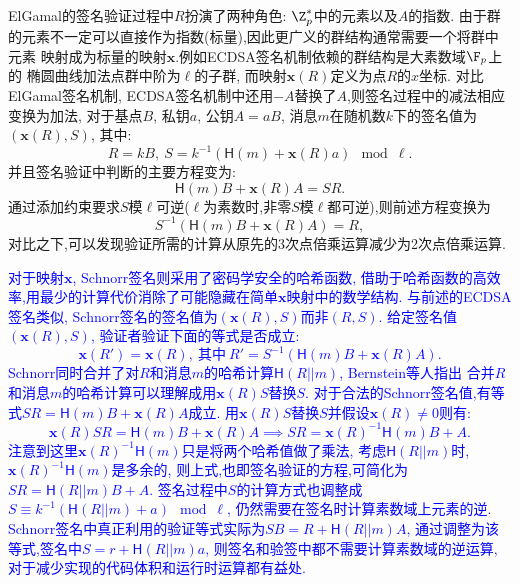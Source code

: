 ElGamal的签名验证过程中$R$扮演了两种角色: $\Z^*_p$中的元素以及$A$的指数.
由于群的元素不一定可以直接作为指数(标量),因此更广义的群结构通常需要一个将群中元素
映射成为标量的映射$\mathbf{x}$.例如ECDSA签名机制依赖的群结构是大素数域$\F_p$上的
椭圆曲线加法点群中阶为$\ell$的子群, 而映射$\mathbf{x}(R)$定义为点$R$的$x$坐标.
对比ElGamal签名机制, ECDSA签名机制中还用$-A$替换了$A$,则签名过程中的减法相应
变换为加法, 对于基点$B$, 私钥$a$, 公钥$A = aB$, 
消息$m$在随机数$k$下的签名值为$(\mathbf{x}(R),S)$, 其中:
$$R = kB, \ S = k^{-1}(\textsf{H}(m) + \mathbf{x}(R)a) \mod \ell.$$
并且签名验证中判断的主要方程变为: 
$$\textsf{H}(m)B + \mathbf{x}(R)A = SR.$$
通过添加约束要求$S$模$\ell$可逆($\ell$为素数时,非零$S$模$\ell$都可逆),则前述方程变换为
$$S^{-1}\left(\textsf{H}(m)B + \mathbf{x}(R)A\right) = R,$$
对比之下,可以发现验证所需的计算从原先的3次点倍乘运算减少为2次点倍乘运算.

\textcolor{blue}{
对于映射$\mathbf{x}$, Schnorr签名则采用了密码学安全的哈希函数,
借助于哈希函数的高效率,用最少的计算代价消除了可能隐藏在简单$\mathbf{x}$映射中的数学结构.
与前述的ECDSA签名类似, Schnorr签名的签名值为$(\mathbf{x}(R), S)$而非$(R,S)$.
给定签名值$(\mathbf{x}(R), S)$, 验证者验证下面的等式是否成立:
$$\mathbf{x}(R') = \mathbf{x}(R),\ \text{其中}\ R' = S^{-1}(\textsf{H}(m)B + \mathbf{x}(R)A) .$$
Schnorr同时合并了对$R$和消息$m$的哈希计算$\textsf{H}(R||m)$, Bernstein等人指出
合并$R$和消息$m$的哈希计算可以理解成用$\mathbf{x}(R)S$替换$S$.
对于合法的Schnorr签名值,有等式$SR = \textsf{H}(m)B + \mathbf{x}(R)A$成立.
用$\mathbf{x}(R)S$替换$S$并假设$\mathbf{x}(R)\neq0$则有:
$$\mathbf{x}(R)SR = \textsf{H}(m)B + \mathbf{x}(R)A \implies 
SR = \mathbf{x}(R)^{-1}\textsf{H}(m)B + A.$$
注意到这里$\mathbf{x}(R)^{-1}\textsf{H}(m)$只是将两个哈希值做了乘法,
考虑$\textsf{H}(R||m)$时, $\mathbf{x}(R)^{-1}\textsf{H}(m)$是多余的,
则上式,也即签名验证的方程,可简化为$SR = \textsf{H}(R||m)B + A$.
签名过程中$S$的计算方式也调整成$S \equiv k^{-1}(\textsf{H}(R||m) + a) \mod \ell$,
仍然需要在签名时计算素数域上元素的逆.
Schnorr签名中真正利用的验证等式实际为$SB = R+ \textsf{H}(R||m)A$,
通过调整为该等式,签名中$S = r + \textsf{H}(R||m) a$, 则签名和验签中都不需要计算素数域的逆运算,
对于减少实现的代码体积和运行时运算都有益处.
}


